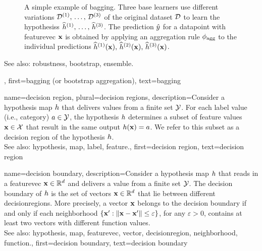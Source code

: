 {{\begin{figure}[H]
\begin{center}
		\caption{A simple example of bagging. Three base learners use different variations 
	      	$\mathcal{D}^{(1)},\,\ldots,\,\mathcal{D}^{(3)}$ of the original \gls{dataset} $\mathcal{D}$ to 
		learn the \glspl{hypothesis} $\widehat{h}^{(1)},\,\ldots,\,\widehat{h}^{(3)}$. 
		The \gls{prediction} $\hat{y}$ for a \gls{datapoint} with \gls{featurevec} ${\bf x}$ 
		is obtained by applying an aggregation rule $\phi_{\rm agg}$ to the individual \glspl{prediction} 
		$\widehat{h}^{(1)}({\bf x}),\,\widehat{h}^{(2)}({\bf x}),\,\widehat{h}^{(3)}({\bf x})$. }
		\end{center}
		\end{figure}
		See also: \gls{robustness}, \gls{bootstrap}, \gls{ensemble}.},
	first={bagging (or bootstrap aggregation)},
	text={bagging}
}

{name={decision region}, plural={decision regions}, 
	description={Consider 
		a \gls{hypothesis} \gls{map} $h$ that delivers values from a finite set $\mathcal{Y}$. 
		For each \gls{label} value (i.e., category) $a \in \mathcal{Y}$, the \gls{hypothesis} $h$ 
		determines a subset of \gls{feature} values ${\bf x} \in \mathcal{X}$ that result 
		in the same output $h({\bf x})=a$. We refer to this subset as a decision 
		region of the \gls{hypothesis} $h$.
				\\
		See also: \gls{hypothesis}, \gls{map}, \gls{label}, \gls{feature}.},
	first={decision region},
	text={decision region} 
}


{name={decision boundary}, 
	description={Consider a 
		\gls{hypothesis} \gls{map} $h$ that reads in a \gls{featurevec}  
		${\bf x} \in \mathbb{R}^{d}$ and delivers a value from a finite set $\mathcal{Y}$. 
		The decision boundary of $h$ is the set of \glspl{vector} ${\bf x} \in \mathbb{R}^{d}$ 
		that lie between different \glspl{decisionregion}. More precisely, a 
		\gls{vector} ${\bf x}$ belongs to the decision boundary if and only 
		if each \gls{neighborhood} $\{ {\bf x}': \| {\bf x} - {\bf x}' \| \leq \varepsilon \}$, 
		for any $\varepsilon >0$, contains at least two \glspl{vector} with different \gls{function} values.
				\\
		See also: \gls{hypothesis}, \gls{map}, \gls{featurevec}, \gls{vector}, \gls{decisionregion}, \gls{neighborhood}, \gls{function}.},
	first={decision boundary},
	text={decision boundary} 
}


